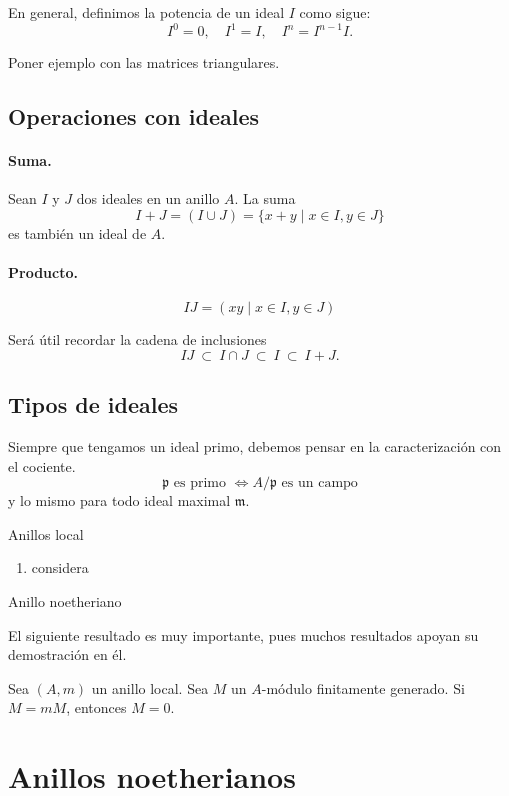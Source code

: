 \documentclass[b5paper,10pt]{book}
\begin{document}
En general, definimos la potencia de un ideal \(I\) como sigue:
\[
I^0 = 0,\quad I^1 = I, \quad I^n = I^{n-1}I.
\]

Poner ejemplo con las matrices triangulares.

\subsection{Operaciones con ideales}

\paragraph{Suma.}%
Sean \(I\) y \(J\) dos ideales en un anillo \(A\).
La suma 
\[
I+J = \left(I\cup J\right)= \{x+y \mid x\in I, y\in J\}
\]
es también un ideal de \(A\).

\paragraph{Producto.}%
\[
IJ = \left(xy\mid x\in I, y\in J\right)
\]


Será útil recordar la cadena de inclusiones
\[
IJ\ \subset\ I\cap J\ \subset\ I\ \subset\ I+J.
\]

\subsection{Tipos de ideales}

Siempre que tengamos un ideal primo,
debemos pensar en la caracterización con el cociente.
\[
	\mathfrak{p}\text{ es primo } \iff A/\mathfrak{p} \text{ es un campo}
\]
y lo mismo para todo ideal maximal \(\mathfrak{m}\).


Anillos local


\begin{ej}
\begin{enumerate}[label=(i)]
	\item considera
\end{enumerate}
\end{ej}
Anillo noetheriano

El siguiente resultado es muy importante,
pues muchos resultados apoyan su demostración en él.

\begin{thm}
Sea \((A,m)\) un anillo local.
Sea \(M\) un \(A\)-módulo finitamente generado.
Si \(M=mM\), entonces \(M=0\).
\end{thm}

\section{Anillos noetherianos}
\end{document}

